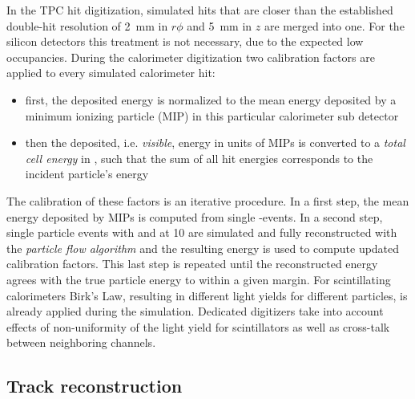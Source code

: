 In the TPC hit digitization, simulated hits that are closer than the established double-hit resolution
of 2~mm in $r\phi$ and 5~mm in $z$ are merged into one.
For the silicon detectors this treatment is not necessary, due to the expected low occupancies.
%
During the calorimeter digitization two calibration factors are applied to every simulated calorimeter hit:
\begin{itemize}
\item first, the deposited energy is normalized to the mean energy deposited by a minimum ionizing particle (MIP) in this particular calorimeter
  sub detector
\item  then the deposited, i.e. \emph{visible}, energy in units of MIPs is converted to a \emph{total cell energy} in \GeV, such that the
  sum of all hit energies corresponds to the incident particle's energy
\end{itemize}

The calibration of these factors is an iterative procedure. In a first step, the mean energy deposited by MIPs is computed from single \Pmuon-events.
In a second step, single particle events with \Pphoton and \PKzL at  \unit{10}{\GeV} are simulated and fully reconstructed with the \emph{particle flow algorithm}
and the resulting energy is used to compute updated calibration factors. This last step is repeated until the reconstructed energy agrees with the true particle
energy to within a given margin.
%
For scintillating calorimeters Birk's Law, resulting in different light yields for different
particles, is already applied during the simulation. Dedicated digitizers take into account
effects of non-uniformity of the light yield for scintillators as well as cross-talk between
neighboring channels.

\subsection{Track reconstruction}

